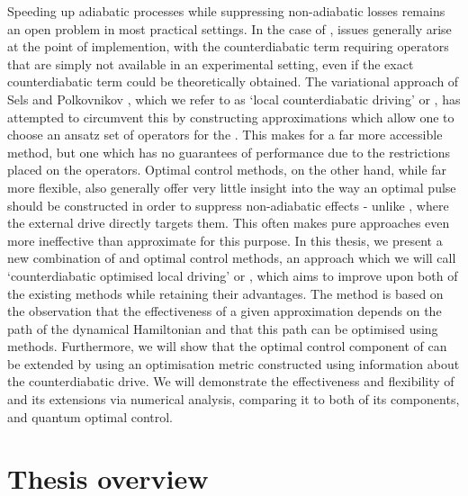 Speeding up adiabatic processes while suppressing non-adiabatic losses remains an open problem in most practical settings. In the case of , issues generally arise at the point of implemention, with the counterdiabatic term requiring operators that are simply not available in an experimental setting, even if the exact counterdiabatic term could be theoretically obtained. The variational approach of Sels and Polkovnikov \cite{sels_minimizing_2017}, which we refer to as `local counterdiabatic driving' or , has attempted to circumvent this by constructing approximations which allow one to choose an ansatz set of operators for the . This makes for a far more accessible method, but one which has no guarantees of performance due to the restrictions placed on the operators. Optimal control methods, on the other hand, while far more flexible, also generally offer very little insight into the way an optimal pulse should be constructed in order to suppress non-adiabatic effects - unlike , where the external drive directly targets them. This often makes pure  approaches even more ineffective than approximate  for this purpose. In this thesis, we present a new combination of  and optimal control methods, an approach which we will call `counterdiabatic optimised local driving' or  \cite{cepaite_counterdiabatic_2023}, which aims to improve upon both of the existing methods while retaining their advantages. The method is based on the observation that the effectiveness of a given  approximation depends on the path of the dynamical Hamiltonian and that this path can be optimised using  methods. Furthermore, we will show that the optimal control component of  can be extended by using an optimisation metric constructed using information about the counterdiabatic drive. We will demonstrate the effectiveness and flexibility of  and its extensions via numerical analysis, comparing it to both of its components,  and quantum optimal control.

\section{Thesis overview}

